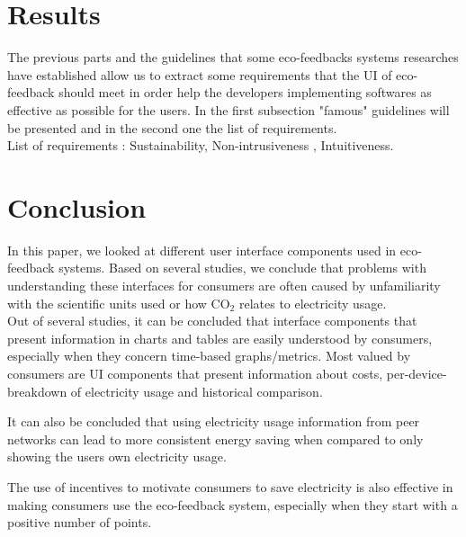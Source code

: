 \documentclass[journal]{vgtc}                %
\begin{document}
\section{Results}
The previous parts and the guidelines that some eco-feedbacks systems researches have established allow us to extract some requirements that the UI of eco-feedback should meet in order help the developers implementing softwares as effective as possible for the users. In the first subsection "famous" guidelines will be presented and in the second one the list of requirements. \\
List of requirements : 
Sustainability, Non-intrusiveness , Intuitiveness.


\section{Conclusion}
In this paper, we looked at different user interface components used in eco-feedback systems. Based on several studies, we conclude that problems with understanding these interfaces for consumers are often caused by unfamiliarity with the scientific units used or how CO$_2$ relates to electricity usage. \\

Out of several studies, it can be concluded that interface components that present information in charts and tables are easily understood by consumers, especially when they concern time-based graphs/metrics. 
Most valued by consumers are UI components that present information about costs, per-device-breakdown of electricity usage and historical comparison.

It can also be concluded that using electricity usage information from peer networks can lead to more consistent energy saving when compared to only showing the users own electricity usage.

The use of incentives to motivate consumers to save electricity is also effective in making consumers use the eco-feedback system, especially when they start with a positive number of points.





\end{document}

